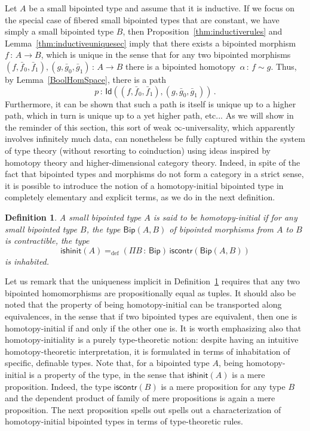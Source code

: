 \documentclass[10pt,a4paper,oneside,reqno]{amsart}
\numberwithin{equation}{section}
\theoremstyle{mythm}
\theoremstyle{mydef}
\newtheorem{definition}[theorem]{Definition}
\theoremstyle{myrmk}
\newcommand{\ie}{\text{i.e.\ }}
\newcommand{\defeq}{=_{\mathrm{def}}}
\newcommand{\co}{\,{:}\,}
\newcommand{\iscontr}{\mathsf{iscontr}}
\newcommand{\ishinit}{\mathsf{ishinit}}
\newcommand{\Id}{\mathsf{Id}}
\newcommand{\Bip}{\mathsf{Bip}}
\newcommand{\BipHom}{\mathsf{Bip}}
\begin{document}
 \medskip
 
 Let $A$ be a small bipointed type and assume that it is inductive. 
  If we focus on the special case of fibered small bipointed types that 
are constant, \ie we have simply a small bipointed type $B$, then 
 Proposition~\ref{thm:inductiverules} and Lemma~\ref{thm:inductiveuniquesec}
imply that there exists a bipointed morphism~$f \co A \to B$, which is unique in the sense that  for any two bipointed morphisms $(f, \bar{f}_0, \bar{f}_1), (g, \bar{g}_0, \bar{g}_1) \co A \to B$  there is a bipointed homotopy~$\alpha \co f \sim g$. Thus, by Lemma~\ref{BoolHomSpace}, there is a path 
\[
p \co \Id((f, \bar{f}_0, \bar{f}_1), (g, \bar{g}_0, \bar{g}_1)) \, .
\] 
Furthermore, it can be shown that such a path is itself is unique up to a higher path, which in turn is unique up to a yet higher path, etc... As we will show in the reminder of this section, this sort of weak $\infty$-universality, which apparently involves infinitely much data, can nonetheless be fully captured within the system of type theory (without resorting to coinduction) using ideas inspired by homotopy theory and higher-dimensional category theory. Indeed, in spite of the fact that bipointed types and morphisms do not form a category in a strict sense, it is possible to introduce the  notion of a homotopy-initial bipointed type in completely elementary and explicit terms, as we do in the next definition.


\begin{definition}\label{def:BoolInit}
A small bipointed type $A$ is said to be \emph{homotopy-initial}  if for any small bipointed type $B$, the type $\BipHom(A,B)$ of bipointed morphisms from $A$ to $B$
is contractible, \ie the type
\[
\ishinit(A) \defeq (\Pi B \co \Bip) \, \iscontr(\BipHom(A, B) )
\] 
is inhabited.
\end{definition}

Let us remark that the uniqueness implicit in Definition~\ref{def:BoolInit} requires that any two bipointed homomorphisms are propositionally equal as tuples. It should also be noted that the property of being  homotopy-initial  can be transported along equivalences, in the sense that if two bipointed types are equivalent, then one is homotopy-initial if and only if the other one is. It is worth emphasizing also that homotopy-initiality is a purely type-theoretic notion: despite having an intuitive homotopy-theoretic interpretation, it is formulated in terms of inhabitation of specific, definable types. Note that, for a bipointed type $A$, being homotopy-initial is a property of the type, in the
sense that $\ishinit(A)$ is a mere proposition. Indeed, the type $\iscontr(B)$ is a mere proposition for any type $B$ and the dependent product of family of mere propositions is again a mere proposition.  The next proposition spells out spells out a  characterization of homotopy-initial bipointed types in terms of type-theoretic rules.
\end{document}
